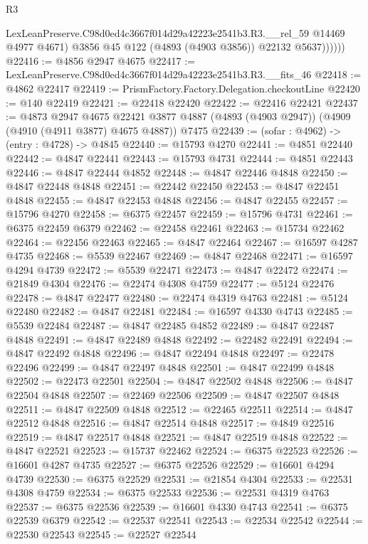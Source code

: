 \begin{lexlean}{R3}
\begin{coremodule}
                LexLeanPreserve.C98d0ed4c3667f014d29a42223e2541b3.R3.__rel_59 @14469 @4977 @4671)
                @3856
                @45
                @122
                (@4893 (@4903 @3856))
                @22132
                @5637))))))
@22416 := @4856 @2947 @4675
@22417 := LexLeanPreserve.C98d0ed4c3667f014d29a42223e2541b3.R3.__fits_46
@22418 := @4862 @22417
@22419 := PrismFactory.Factory.Delegation.checkoutLine
@22420 := @140 @22419
@22421 := @22418 @22420
@22422 := @22416 @22421
@22437 := @4873
    @2947
    @4675
    @22421
    @3877
    @4887
    (@4893 (@4903 @2947))
    (@4909 (@4910 (@4911 @3877) @4675 @4887))
    @7475
@22439 := (sofar : @4962) -> (entry : @4728) -> @4845
@22440 := @15793 @4270
@22441 := @4851 @22440
@22442 := @4847 @22441
@22443 := @15793 @4731
@22444 := @4851 @22443
@22446 := @4847 @22444 @4852
@22448 := @4847 @22446 @4848
@22450 := @4847 @22448 @4848
@22451 := @22442 @22450
@22453 := @4847 @22451 @4848
@22455 := @4847 @22453 @4848
@22456 := @4847 @22455
@22457 := @15796 @4270
@22458 := @6375 @22457
@22459 := @15796 @4731
@22461 := @6375 @22459 @6379
@22462 := @22458 @22461
@22463 := @15734 @22462
@22464 := @22456 @22463
@22465 := @4847 @22464
@22467 := @16597 @4287 @4735
@22468 := @5539 @22467
@22469 := @4847 @22468
@22471 := @16597 @4294 @4739
@22472 := @5539 @22471
@22473 := @4847 @22472
@22474 := @21849 @4304
@22476 := @22474 @4308 @4759
@22477 := @5124 @22476
@22478 := @4847 @22477
@22480 := @22474 @4319 @4763
@22481 := @5124 @22480
@22482 := @4847 @22481
@22484 := @16597 @4330 @4743
@22485 := @5539 @22484
@22487 := @4847 @22485 @4852
@22489 := @4847 @22487 @4848
@22491 := @4847 @22489 @4848
@22492 := @22482 @22491
@22494 := @4847 @22492 @4848
@22496 := @4847 @22494 @4848
@22497 := @22478 @22496
@22499 := @4847 @22497 @4848
@22501 := @4847 @22499 @4848
@22502 := @22473 @22501
@22504 := @4847 @22502 @4848
@22506 := @4847 @22504 @4848
@22507 := @22469 @22506
@22509 := @4847 @22507 @4848
@22511 := @4847 @22509 @4848
@22512 := @22465 @22511
@22514 := @4847 @22512 @4848
@22516 := @4847 @22514 @4848
@22517 := @4849 @22516
@22519 := @4847 @22517 @4848
@22521 := @4847 @22519 @4848
@22522 := @4847 @22521
@22523 := @15737 @22462
@22524 := @6375 @22523
@22526 := @16601 @4287 @4735
@22527 := @6375 @22526
@22529 := @16601 @4294 @4739
@22530 := @6375 @22529
@22531 := @21854 @4304
@22533 := @22531 @4308 @4759
@22534 := @6375 @22533
@22536 := @22531 @4319 @4763
@22537 := @6375 @22536
@22539 := @16601 @4330 @4743
@22541 := @6375 @22539 @6379
@22542 := @22537 @22541
@22543 := @22534 @22542
@22544 := @22530 @22543
@22545 := @22527 @22544

\end{coremodule}
\end{lexlean}
